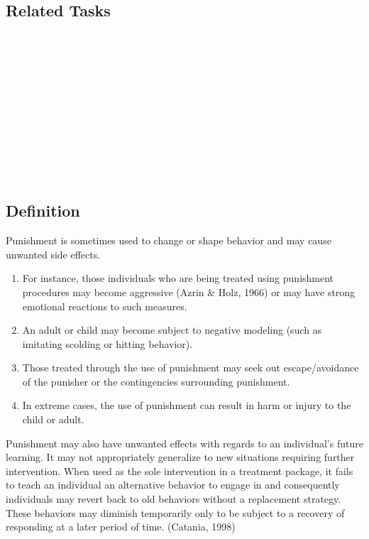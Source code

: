 \subsection{Related Tasks}
\fourdOne{}\\
\fourdTwo{}\\
\fourdTwentyOne{}\\
\foureEleven{}\\
\fouriSeven{}\\
\fourjFour{}\\
\fourjFive{}\\
\fourjSix{}\\
\fourjSeven{}\\
\fourjEleven{}\\
%
%
%
%
%
%
%
%
%
%
%
%
%
%
\section[\fourcTwo{}]{\fourcTwo{}%
              }
\subsection{Definition}
Punishment is sometimes used to change or shape behavior and may cause unwanted side effects. 
\begin{enumerate}
\item For instance, those individuals who are being treated using punishment procedures may become aggressive (Azrin \& Holz, 1966) or may have strong emotional reactions to such measures.  
\item An adult or child may become subject to negative modeling (such as imitating scolding or hitting behavior).
\item Those treated through the use of punishment may seek out escape/avoidance of the punisher or the contingencies surrounding punishment. 
\item In extreme cases, the use of punishment can result in harm or injury to the child or adult.  
\end{enumerate}

Punishment may also have unwanted effects with regards to an individual's future learning.  It may not appropriately generalize to new situations requiring further intervention. When used as the sole intervention in a treatment package, it fails to teach an individual an alternative behavior to engage in and consequently individuals may revert back to old behaviors without a replacement strategy. These behaviors may diminish temporarily only to be subject to a recovery of responding at a later period of time. (Catania, 1998)

